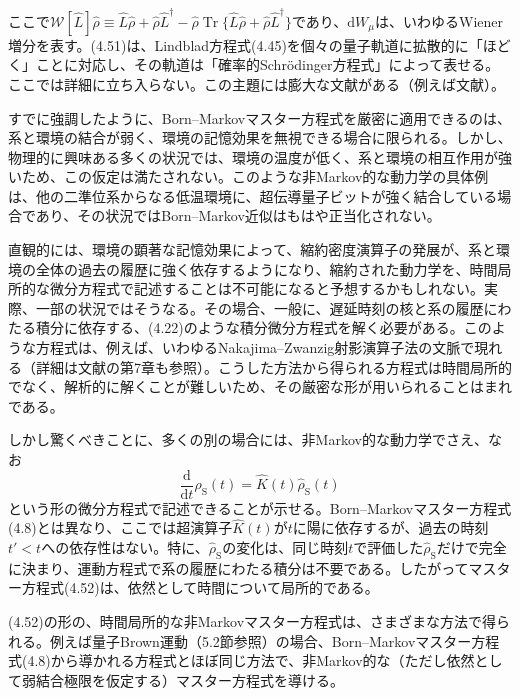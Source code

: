 \hypertarget{srcpage:169}{}\label{srcpage:169}
ここで$\mathcal W[\hat L]\hat\rho\equiv\hat L\hat\rho+\hat\rho\hat L^{\dagger}-\hat\rho\operatorname{Tr}\{\hat L\hat\rho+\hat\rho\hat L^{\dagger}\}$であり、$\mathrm dW_\mu$は、いわゆるWiener増分を表す。(4.51)は、Lindblad方程式(4.45)を個々の量子軌道に拡散的に「ほどく」ことに対応し、その軌道は「確率的Schrödinger方程式」によって表せる。ここでは詳細に立ち入らない。この主題には膨大な文献がある（例えば文献\cite{ref186,ref187,ref188,ref189,ref190,ref191,ref192,ref193,ref194,ref195,ref196,ref197,ref198}）。

すでに強調したように、Born--Markovマスター方程式を厳密に適用できるのは、系と環境の結合が弱く、環境の記憶効果を無視できる場合に限られる。しかし、物理的に興味ある多くの状況では、環境の温度が低く、系と環境の相互作用が強いため、この仮定は満たされない。このような非Markov的な動力学の具体例は、他の二準位系からなる低温環境に、超伝導量子ビットが強く結合している場合であり、その状況ではBorn--Markov近似はもはや正当化されない\cite{ref199,ref200}。

直観的には、環境の顕著な記憶効果によって、縮約密度演算子の発展が、系と環境の全体の過去の履歴に強く依存するようになり、縮約された動力学を、時間局所的な微分方程式で記述することは不可能になると予想するかもしれない。実際、一部の状況ではそうなる。その場合、一般に、遅延時刻の核と系の履歴にわたる積分に依存する、(4.22)のような積分微分方程式を解く必要がある。このような方程式は、例えば、いわゆるNakajima--Zwanzig射影演算子法\cite{ref201,ref202,ref203}の文脈で現れる（詳細は文献\cite{ref017}の第7章も参照）。こうした方法から得られる方程式は時間局所的でなく、解析的に解くことが難しいため、その厳密な形が用いられることはまれである。

しかし驚くべきことに、多くの別の場合には、非Markov的な動力学でさえ、なお
\begin{equation}
\frac{\mathrm d}{\mathrm dt}\hat\rho_{\mathrm S}(t)=\hat K(t)\hat\rho_{\mathrm S}(t)
\tag{4.52}
\end{equation}
という形の微分方程式で記述できることが示せる。Born--Markovマスター方程式(4.8)とは異なり、ここでは超演算子$\hat K(t)$が$t$に陽に依存するが、過去の時刻$t'<t$への依存性はない。特に、$\hat\rho_{\mathrm S}$の変化は、同じ時刻$t$で評価した$\hat\rho_{\mathrm S}$だけで完全に決まり、運動方程式で系の履歴にわたる積分は不要である。したがってマスター方程式(4.52)は、依然として時間について局所的である。

(4.52)の形の、時間局所的な非Markovマスター方程式は、さまざまな方法で得られる。例えば量子Brown運動（5.2節参照）の場合、Born--Markovマスター方程式(4.8)から導かれる方程式とほぼ同じ方法で、非Markov的な（ただし依然として弱結合極限を仮定する）マスター方程式を導ける。

